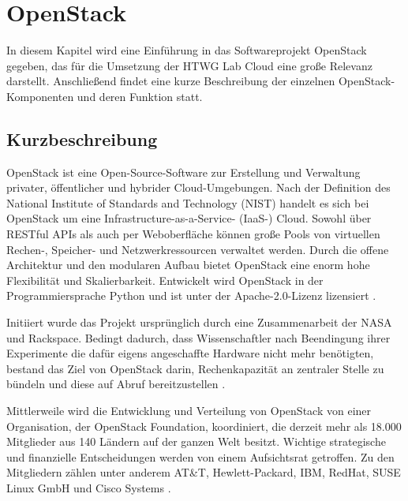\chapter{OpenStack}

In diesem Kapitel wird eine Einführung in das Softwareprojekt OpenStack gegeben, das für die Umsetzung der HTWG Lab Cloud eine große Relevanz darstellt. Anschließend findet eine kurze Beschreibung der einzelnen OpenStack-Komponenten und deren Funktion statt.

\section{Kurzbeschreibung}OpenStack ist eine Open-Source-Software zur Erstellung und Verwaltung privater, öffentlicher und hybrider Cloud-Umgebungen. Nach der Definition des National Institute of Standards and Technology (NIST) handelt es sich bei OpenStack um eine Infrastructure-as-a-Service- (IaaS-) Cloud. Sowohl über RESTful APIs als auch per Weboberfläche können große Pools von virtuellen Rechen-, Speicher- und Netzwerkressourcen verwaltet werden. Durch die offene Architektur und den modularen Aufbau bietet OpenStack eine enorm hohe Flexibilität und Skalierbarkeit. Entwickelt wird OpenStack in der Programmiersprache Python und ist unter der Apache-2.0-Lizenz lizensiert \cite[S. 7ff]{Beitter}. 

Initiiert wurde das Projekt ursprünglich durch eine Zusammenarbeit der NASA und Rackspace. Bedingt dadurch, dass Wissenschaftler nach Beendingung ihrer Experimente die dafür eigens angeschaffte Hardware nicht mehr benötigten, bestand das Ziel von OpenStack darin, Rechenkapazität an zentraler Stelle zu bündeln und diese auf Abruf bereitzustellen \cite[]{Loschwitz}.

Mittlerweile wird die Entwicklung und Verteilung von OpenStack von einer Organisation, der OpenStack Foundation, koordiniert, die derzeit mehr als 18.000 Mitglieder aus 140 Ländern auf der ganzen Welt besitzt. Wichtige strategische und finanzielle Entscheidungen werden von einem Aufsichtsrat getroffen. Zu den Mitgliedern zählen unter anderem AT\&T, Hewlett-Packard, IBM, RedHat, SUSE Linux GmbH und Cisco Systems \cite[]{OpenStackFoundation}.


